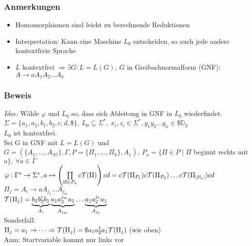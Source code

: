         \subsubsection{Anmerkungen}
            \begin{itemize}
                \item Homomorphismen sind leicht zu berechnende Reduktionen
                \item Interpretation: Kann eine Maschine $L_0$ entscheiden, so auch jede andere kontextfreie Sprache
                \item $L$ kontextfrei $\Rightarrow\exists G:L=L(G),\ G$ in Greibachnormalform (GNF):
                \subitem $A\rightarrow aA_1A_2\dots A_k$
            \end{itemize}
        \subsubsection{Beweis}
            \emph{Idee:} Wähle $\varphi$ und $L_0$ so, dass sich Ableitung in GNF in $L_0$ wiederfindet.\\[0.2cm]
            $\Sigma=\{a_1,a_2,b_1,b_2,c,d,\$\},\ L_0\subseteq \Sigma^*,\ x_i,z_i\in\Sigma^*, y_1y_2\dots y_n\in\$\mathds{D}_2$\\
            $L_0$ ist kontextfrei.\\[0,2cm]
            Sei G in GNF mit $L=L(G)$ und $G=\left(\{A_1,\dots,A_{|V|}\},\Gamma,P=\{\Pi_1,\dots,\Pi_k\},A_1\right),\ P_a=\{\Pi\in P\mid \Pi$ beginnt rechts mit $a\},\ \forall a\in\Gamma$\\
            $\varphi:\Gamma^*\rightarrow\Sigma^*, a\mapsto \left(\prod\limits_{\Pi\in P_a}c\mathcal{T}(\Pi)\right)cd=c\mathcal{T}(\Pi_{P_1})c\mathcal{T}(\Pi_{P_2})\dots c\mathcal{T}(\Pi_{|P_a|})cd$\\
            $\Pi_j=A_i\rightarrow aA_{j_1}\dots A_{j_m}$\\
            $\mathcal{T}(\Pi_j)=\underbrace{b_1b_2^ib_1}_{A_i}\underbrace{a_1a_2^{j_m}a_1}_{A_{j_m}}\dots \underbrace{a_1a_2^{j_1}a_1}_{A_{j_1}}$\\
            Sonderfall:\\
            $\Pi_j=a_1\rightarrow\dots \Rightarrow \mathcal{T}(\Pi_j)=\$a_1a_2^1a_1\mathcal{T}(\Pi_j)$ (wie oben)\\
            Anm: Startvariable kommt nur links vor
